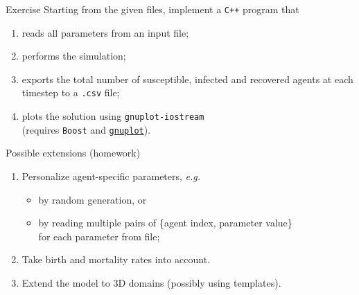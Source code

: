 \documentclass[10pt]{beamer}
\begin{document}
\begin{frame}{Exercise}
Starting from the given files, implement a \texttt{C++} program that
\begin{enumerate}
    \item reads all parameters from an input file;
    \item performs the simulation;
    \item exports the total number of susceptible, infected and recovered agents at each timestep to a \texttt{.csv} file;
    \item plots the solution using \texttt{gnuplot-iostream}\\
          (requires \texttt{Boost} and \href{http://www.gnuplot.info/download.html}{\texttt{gnuplot}}).
\end{enumerate}
\end{frame}

\begin{frame}{Possible extensions (homework)}
\begin{enumerate}
    \item Personalize agent-specific parameters, \textit{e.g.}
    \begin{itemize}
        \item by random generation, or
        \item by reading multiple pairs of \{agent index, parameter value\}\\
              for each parameter from file;
    \end{itemize}
    \item Take birth and mortality rates into account.
    \item Extend the model to 3D domains (possibly using templates).
\end{enumerate}
\end{frame}
\end{document}
